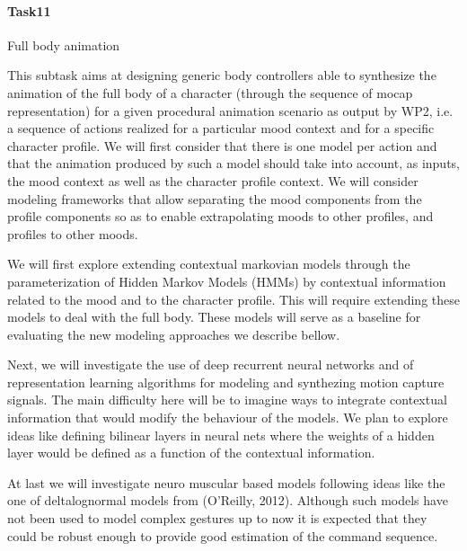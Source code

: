 \paragraph{Task11} Full body animation

This subtask aims at designing generic body controllers able to synthesize the animation of the full body of a character (through the sequence of mocap representation) for a given procedural animation scenario as output by WP2, i.e. a sequence of actions realized for a particular mood context and for a specific character profile. We will first consider that there is one model per action and that the animation produced by such a model should take into account, as inputs, the mood context as well as the character profile context. We will consider modeling frameworks that allow separating the mood components from the profile components so as to enable extrapolating moods to other profiles, and profiles to other moods. 

We will first explore extending contextual markovian models \cite{Ding2013, Ding2014} through the parameterization of Hidden Markov Models (HMMs) by contextual information related to the mood and to the character profile. This will require extending these models to deal with the full body. These models will serve as a baseline for evaluating the new modeling approaches we describe bellow. 

Next, we will investigate the use of deep recurrent neural networks and of representation learning algorithms for modeling and synthezing motion capture signals. The main difficulty here will be to imagine ways to integrate contextual information that would modify the behaviour of the models. We plan to explore ideas like defining bilinear layers in neural nets where the weights of a hidden layer would be defined as a function of the contextual information.

At last we will investigate neuro muscular based models following ideas like the one of deltalognormal models from (O'Reilly, 2012). Although such models have not been used to model complex gestures up to now it is expected that they could be robust enough to provide good estimation of the command sequence. 


% 

